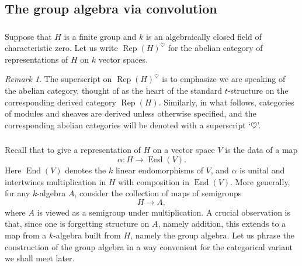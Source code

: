 \documentclass[10pt]{amsart}
\newcommand{\on}{\operatorname}
\theoremstyle{remark}
\newtheorem{re}[subsubsection]{Remark}
\numberwithin{equation}{section}
\begin{document}
	
	
	
	
	
	
	
	
	
	
	
	
	\subsection{The group algebra via convolution} 
	
	\subsubsection{} Suppose that $H$ is a finite group and $k$ is an 
	algebraically closed field of characteristic zero. Let us write $\on{Rep}(H)^\heartsuit$ for the abelian category 
	of representations of $H$ on $k$ vector spaces.
	
	\begin{re}The superscript on $\on{Rep}(H)^\heartsuit$ is to emphasize we are speaking of the abelian category, thought of as the heart of the standard $t$-structure on the corresponding derived category $\on{Rep}(H)$. Similarly, in what follows, categories of modules and sheaves are derived unless otherwise specified, and the corresponding abelian categories will be denoted with a superscript `$\heartsuit$'. 
	\end{re}
	
	
	
	
	\subsubsection{} Recall that to give a representation of $H$ on a vector 
	space $V$ is the data of a map
	\begin{equation} \label{e:hom}
	\alpha: H \rightarrow \on{End}(V).
	\end{equation}
	Here $\on{End}(V)$ denotes the $k$ linear endomorphisms of $V$, and $\alpha$ is 
	unital and intertwines multiplication in $H$ with composition in 
	$\on{End}(V)$. More generally, for any $k$-algebra $A$, consider the 
	collection of maps of semigroups 
	\begin{equation}  \label{e:homalg}
	H \rightarrow A,
	\end{equation}
	where $A$ is viewed as a semigroup under multiplication. A crucial 
	observation is that, since one is forgetting structure on $A$, namely addition, this extends 
	to a map from a $k$-algebra built from $H$, namely the group algebra. Let 
	us phrase the construction of the group algebra in a way convenient for the categorical 
	variant we shall meet later.  
	
\end{document}
